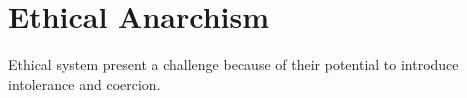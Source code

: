 \section{Ethical Anarchism}\label{Ethical}

Ethical system present a challenge because of their potential to introduce intolerance and coercion.



